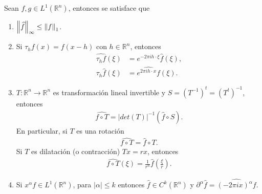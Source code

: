   \begin{theorem}{}
    Sean $f,g\in L^{1}(\mathbb{R}^{n})$, entonces se satisface que
    \begin{enumerate}
      \item $\left\lVert\widehat{f}\right\rVert_{\infty}\leq\left\lVert f\right\rVert_{1}$.
      \item Si $\tau_{h}f(x)=f(x-h)$ con $h\in\mathbb{R}^{n}$, entonces
        \begin{align*}
          \hat{\tau_{h}f}(\xi)&=e^{-2\pi ih\cdot \xi}\hat{f}(\xi),\\
          \tau_{h}\hat{f}(\xi)&=\hat{e^{2\pi ih\cdot x}f}(\xi).
        \end{align*}
      \item $T:\mathbb{R}^{n}\to\mathbb{R}^{n}$ es transformación lineal invertible y $S=\left( T^{-1} \right)^{t}=\left( T^{t} \right)^{-1}$, entonces
        \begin{align*}
          \hat{f\circ T}=|det(T)|^{-1}\left( \hat{f}\circ S \right).
        \end{align*}
        En particular, si $T$ es una rotación
        \begin{align*}
          \hat{f\circ T}=\hat{f}\circ T.
        \end{align*}
        Si $T$ es dilatación (o contracción) $Tx=rx$, entonces
        \begin{align*}
          \hat{f\circ T}(\xi)=\frac{1}{r^{n}}\hat{f}\left( \frac{\xi}{r} \right).
        \end{align*}
      \item Si $x^{\alpha}f\in L^{1}(\mathbb{R}^{n})$, para $|\alpha|\leq k$ entonces $\hat{f}\in C^{k}(\mathbb{R}^{n})$ y $\partial^{\alpha}\hat{f}=\hat{(-2\pi ix)^{\alpha}f}$.
    \end{enumerate}
  \end{theorem}

